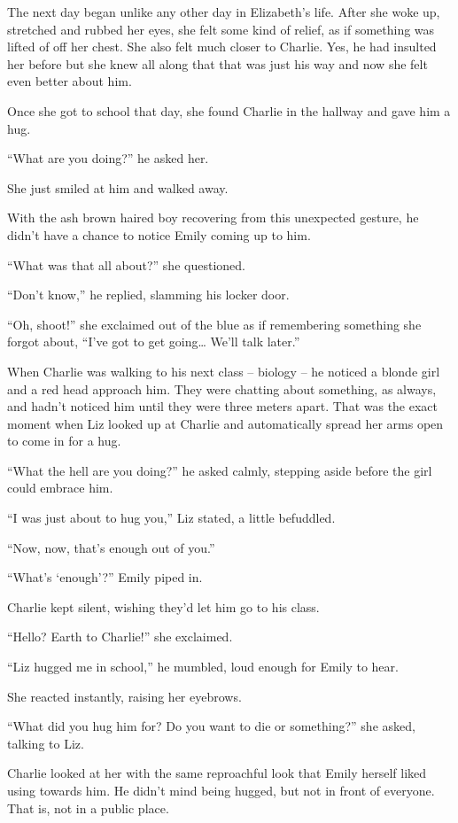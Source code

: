 The next day began unlike any other day in Elizabeth’s life. After she woke up,  stretched and rubbed her eyes, she felt some kind of relief, as if something was lifted of off her chest. She also felt much closer to Charlie. Yes, he had insulted her before but she knew all along that that was just his way and now she felt even better about him.

Once she got to school that day, she found Charlie in the hallway and gave him a hug.

“What are you doing?” he asked her.

She just smiled at him and walked away.

With the ash brown haired boy recovering from this unexpected gesture, he didn’t have a chance to notice Emily coming up to him.

“What was that all about?” she questioned.

“Don’t know,” he replied, slamming his locker door.

“Oh, shoot!” she exclaimed out of the blue as if remembering something she forgot about, “I’ve got to get going… We’ll talk later.”

\bigskip

When Charlie was walking to his next class – biology – he noticed a blonde girl and a red head approach him. They were chatting about something, as always, and hadn’t noticed him until they were three meters apart. That was the exact moment when Liz looked up at Charlie and automatically spread her arms open to come in for a hug.

“What the hell are you doing?” he asked calmly, stepping aside before the girl could embrace him.

“I was just about to hug you,” Liz stated, a little befuddled.

“Now, now, that’s enough out of you.”

“What’s ‘enough’?” Emily piped in.

Charlie kept silent, wishing they’d let him go to his class.

“Hello? Earth to Charlie!” she exclaimed.

“Liz hugged me in school,” he mumbled, loud enough for Emily to hear.

She reacted instantly, raising her eyebrows.

“What did you hug him for? Do you want to die or something?” she asked, talking to Liz.

Charlie looked at her with the same reproachful look that Emily herself liked using towards him. He didn’t mind being hugged, but not in front of everyone. That is, not in a public place.

